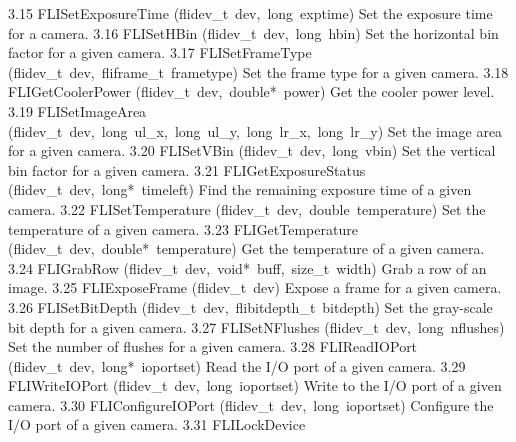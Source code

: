 \documentclass{article}
\begin{document}
\begin{cxxentry}
\begin{cxxnames}
        {3.15}
        {FLISetExposureTime}
        {(flidev\_t\ dev,\ long\ exptime)}
        { Set the exposure time for a camera.}
        {3.16}
        {FLISetHBin}
        {(flidev\_t\ dev,\ long\ hbin)}
        { Set the horizontal bin factor for a given camera.}
        {3.17}
        {FLISetFrameType}
        {(flidev\_t\ dev,\ fliframe\_t\ frametype)}
        { Set the frame type for a given camera.}
        {3.18}
        {FLIGetCoolerPower}
        {(flidev\_t\ dev,\ double*\ power)}
        { Get the cooler power level.}
        {3.19}
        {FLISetImageArea}
        {(flidev\_t\ dev,\ long\ ul\_x,\ long\ ul\_y,\ long\ lr\_x,\ long\ lr\_y)}
        { Set the image area for a given camera.}
        {3.20}
        {FLISetVBin}
        {(flidev\_t\ dev,\ long\ vbin)}
        { Set the vertical bin factor for a given camera.}
        {3.21}
        {FLIGetExposureStatus}
        {(flidev\_t\ dev,\ long*\ timeleft)}
        { Find the remaining exposure time of a given camera.}
        {3.22}
        {FLISetTemperature}
        {(flidev\_t\ dev,\ double\ temperature)}
        { Set the temperature of a given camera.}
        {3.23}
        {FLIGetTemperature}
        {(flidev\_t\ dev,\ double*\ temperature)}
        { Get the temperature of a given camera.}
        {3.24}
        {FLIGrabRow}
        {(flidev\_t\ dev,\ void*\ buff,\ size\_t\ width)}
        { Grab a row of an image.}
        {3.25}
        {FLIExposeFrame}
        {(flidev\_t\ dev)}
        { Expose a frame for a given camera.}
        {3.26}
        {FLISetBitDepth}
        {(flidev\_t\ dev,\ flibitdepth\_t\ bitdepth)}
        { Set the gray-scale bit depth for a given camera.}
        {3.27}
        {FLISetNFlushes}
        {(flidev\_t\ dev,\ long\ nflushes)}
        { Set the number of flushes for a given camera.}
        {3.28}
        {FLIReadIOPort}
        {(flidev\_t\ dev,\ long*\ ioportset)}
        { Read the I/O port of a given camera.}
        {3.29}
        {FLIWriteIOPort}
        {(flidev\_t\ dev,\ long\ ioportset)}
        { Write to the I/O port of a given camera.}
        {3.30}
        {FLIConfigureIOPort}
        {(flidev\_t\ dev,\ long\ ioportset)}
        { Configure the I/O port of a given camera.}
        {3.31}
        {FLILockDevice}

\end{cxxnames}
\end{cxxentry}
\end{document}
